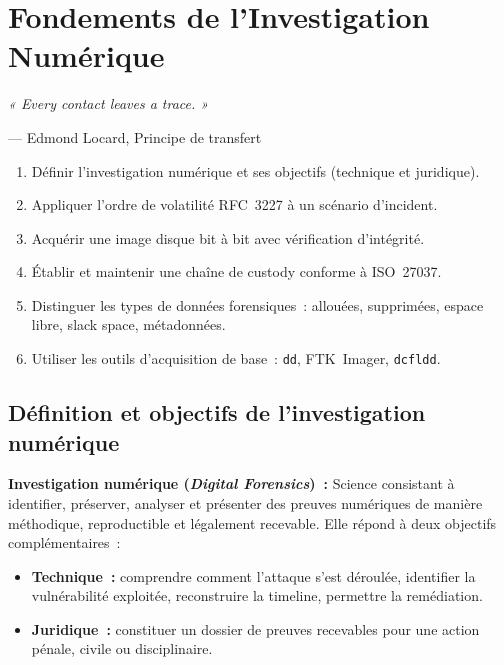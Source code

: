 \chapter{Fondements de l'Investigation Numérique}
\label{chap:forensics-fondements}

\epigraph{\itshape « Every contact leaves a trace. »}
         {--- Edmond Locard, Principe de transfert}

\begin{boxobjectifs}
\begin{enumerate}
  \item Définir l'investigation numérique et ses objectifs (technique et juridique).
  \item Appliquer l'ordre de volatilité RFC~3227 à un scénario d'incident.
  \item Acquérir une image disque bit à bit avec vérification d'intégrité.
  \item Établir et maintenir une chaîne de custody conforme à ISO~27037.
  \item Distinguer les types de données forensiques~: allouées, supprimées,
        espace libre, slack space, métadonnées.
  \item Utiliser les outils d'acquisition de base~: \texttt{dd}, FTK~Imager,
        \texttt{dcfldd}.
\end{enumerate}
\end{boxobjectifs}

\section{Définition et objectifs de l'investigation numérique}
\label{sec:forensics-def}

\begin{boxdef}
\textbf{Investigation numérique (\textit{Digital Forensics})~:} Science
consistant à identifier, préserver, analyser et présenter des preuves
numériques de manière méthodique, reproductible et légalement recevable.
Elle répond à deux objectifs complémentaires~:
\begin{itemize}
  \item \textbf{Technique~:} comprendre comment l'attaque s'est déroulée,
        identifier la vulnérabilité exploitée, reconstruire la timeline,
        permettre la remédiation.
  \item \textbf{Juridique~:} constituer un dossier de preuves recevables
        pour une action pénale, civile ou disciplinaire.
\end{itemize}
\end{boxdef}

